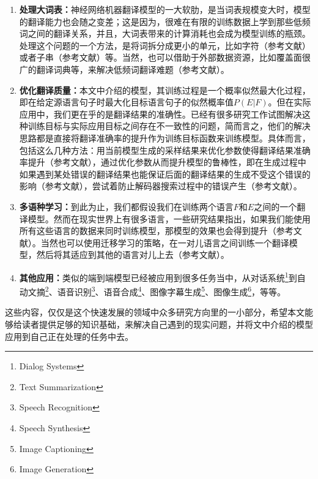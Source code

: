 \documentclass[10pt,a4paper]{ctexart}
\begin{document}
\begin{enumerate}
\item[] \textbf{处理大词表：}神经网络机器翻译模型的一大软肋，是当词表规模变大时，模型的翻译能力也会随之变差；这是因为，很难在有限的训练数据上学到那些低频词之间的翻译关系，并且，大词表带来的计算消耗也会成为模型训练的瓶颈。处理这个问题的一个方法，是将词拆分成更小的单元，比如字符（参考文献\cite{chung2016character}）或者子串（参考文献\cite{sennrich2015neural}）等。当然，也可以借助于外部数据资源，比如覆盖面很广的翻译词典等，来解决低频词翻译难题（参考文献\cite{arthur2016incorporating}）。
\item[] \textbf{优化翻译质量：}本文中介绍的模型，其训练过程是一个概率似然最大化过程，即在给定源语言句子时最大化目标语言句子的似然概率值$P(E|F)$。但在实际应用中，我们更在乎的是翻译结果的准确性。已经有很多研究工作试图解决这种训练目标与实际应用目标之间存在不一致性的问题，简而言之，他们的解决思路都是直接将翻译准确率的提升作为训练目标函数来训练模型。具体而言，包括这么几种方法：用当前模型生成的采样结果来优化参数使得翻译结果准确率提升（参考文献\cite{ranzato2015sequence,shen2015minimum}），通过优化参数从而提升模型的鲁棒性，即在生成过程中如果遇到某处错误的翻译结果也能保证后面的翻译结果的生成不受这个错误的影响（参考文献\cite{NIPS2015_5956,norouzi2016reward}），尝试着防止解码器搜索过程中的错误产生（参考文献\cite{wiseman2016sequence}）。
\item[] \textbf{多语种学习：}到此为止，我们都假设我们在训练两个语言$F$和$E$之间的一个翻译模型。然而在现实世界上有很多语言，一些研究结果指出，如果我们能使用所有这些语言的数据来同时训练模型，那模型的效果也会得到提升（参考文献\cite{firat2016multi,johnson2016google,ha2016toward}）。当然也可以使用迁移学习的策略，在一对儿语言之间训练一个翻译模型，然后将其适应到其他的语言对儿上去（参考文献\cite{zoph2016transfer}）。
\item[] \textbf{其他应用：}类似的端到端模型已经被应用到很多任务当中，从对话系统\footnote{Dialog Systems}\cite{vinyals2015neural,shang2015neural}到自动文摘\footnote{Text Summarization}\cite{rush2015neural}、语音识别\footnote{Speech Recognition}\cite{chan2016listen}、语音合成\footnote{Speech Synthesis}\cite{van2016wavenet}、图像字幕生成\footnote{Image Captioning}\cite{karpathy2015deep,vinyals2015show}、图像生成\footnote{Image Generation}\cite{gregor2015draw}，等等。
\end{enumerate}

这些内容，仅仅是这个快速发展的领域中众多研究方向里的一小部分，希望本文能够给读者提供足够的知识基础，来解决自己遇到的现实问题，并将文中介绍的模型应用到自己正在处理的任务中去。

\newpage

\begin{appendix}


\end{appendix}
\end{document}
